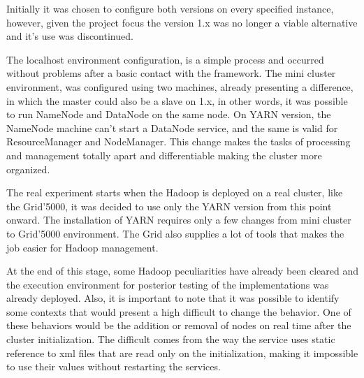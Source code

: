 Initially it was chosen to configure both versions on every specified instance, however, given the project focus the version 1.x was no longer a viable alternative and it's use was discontinued.

The localhost environment configuration, is a simple process and occurred  without problems after a basic contact with the framework. The mini cluster environment, was configured using two machines, already presenting a difference, in which the master could also be a slave on 1.x, in other words, it was possible to run NameNode and DataNode on the same node. On YARN version, the NameNode machine can't start a DataNode service, and the same is valid for ResourceManager and NodeManager. This change makes the tasks of processing and management totally apart and differentiable making the cluster more organized.

The real experiment starts when the Hadoop is deployed on a real cluster, like the Grid'5000, it was decided to use only the YARN version from this point onward. The installation of YARN requires only a few changes from mini cluster to Grid'5000 environment. The Grid also supplies a lot of tools that makes the job easier for Hadoop management.

At the end of this stage, some Hadoop peculiarities have already been cleared and the execution environment for posterior testing of the implementations was already deployed. Also, it is important to note that it was possible to identify some contexts that would present a high difficult to change the behavior. One of these behaviors would be the addition or removal of nodes on real time after the cluster initialization. The difficult comes from the way the service uses static reference to xml files that are read only on the initialization, making it impossible to use their values without restarting the services.